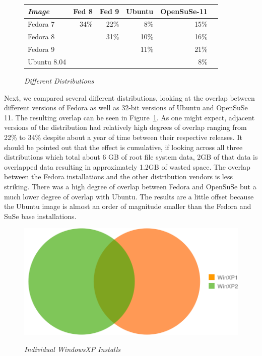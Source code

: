 \begin{figure}[htbp]
\begin{centering}
\begin{tabular}{|l|r|r|r|r|r|}	\hline 
\emph{Image}	& Fed 8	& Fed 9	& Ubuntu	& OpenSuSe-11	\\ \hline
Fedora 7 	& 34\%	& 22\%	&  8\%	& 15\% \\
Fedora 8 	& 	& 31\%	& 10\%	& 16\% \\
Fedora 9	& 	& 	& 11\%	& 21\% \\
Ubuntu 8.04	& 	& 	& 	& 8\% \\	\hline
\end{tabular}
\small\itshape
\caption{\small\itshape Different Distributions}
\label{fig:distro}
\end{centering}
\end{figure}

Next, we compared several different distributions, looking at the overlap
between different versions of Fedora as well as 32-bit versions of
Ubuntu and OpenSuSe 11.
The resulting overlap can be seen in Figure~\ref{fig:distro}. 
As one might expect, adjacent versions of the distribution had relatively
high degrees of overlap ranging from 22\% to 34\% despite about a year of
time between their respective releases.
It should be pointed out that the effect is cumulative, if looking across 
all three distributions which total about 6 GB of root file system data, 
2GB of that data is overlapped data resulting in approximately 1.2GB of
wasted space.
The overlap between the Fedora installations and the other distribution
vendors is less striking.  There was a high degree of overlap between 
Fedora and OpenSuSe but a much lower degree of overlap with Ubuntu.
The results are a little offset because the Ubuntu image is almost an
order of magnitude smaller than the Fedora and SuSe base installations.

\begin{figure}[htbp]
\begin{centering}
\resizebox{\columnwidth}{!}
{\includegraphics{winxp}}
\small\itshape
\caption{\small\itshape Individual WindowsXP Installs}
\label{fig:windows}
\end{centering}
\end{figure}


